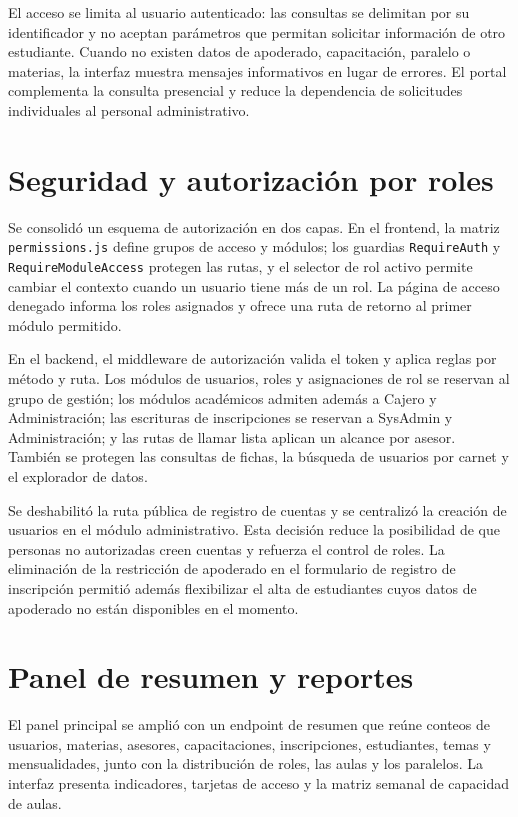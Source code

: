 \documentclass[12pt,a4paper,oneside]{report}
\begin{document}
El acceso se limita al usuario autenticado: las consultas se delimitan por su identificador y no aceptan parámetros que permitan solicitar información de otro estudiante. Cuando no existen datos de apoderado, capacitación, paralelo o materias, la interfaz muestra mensajes informativos en lugar de errores. El portal complementa la consulta presencial y reduce la dependencia de solicitudes individuales al personal administrativo.

\section{Seguridad y autorización por roles}

Se consolidó un esquema de autorización en dos capas. En el frontend, la matriz \texttt{permissions.js} define grupos de acceso y módulos; los guardias \texttt{RequireAuth} y \texttt{RequireModuleAccess} protegen las rutas, y el selector de rol activo permite cambiar el contexto cuando un usuario tiene más de un rol. La página de acceso denegado informa los roles asignados y ofrece una ruta de retorno al primer módulo permitido.

En el backend, el middleware de autorización valida el token y aplica reglas por método y ruta. Los módulos de usuarios, roles y asignaciones de rol se reservan al grupo de gestión; los módulos académicos admiten además a Cajero y Administración; las escrituras de inscripciones se reservan a SysAdmin y Administración; y las rutas de llamar lista aplican un alcance por asesor. También se protegen las consultas de fichas, la búsqueda de usuarios por carnet y el explorador de datos.

Se deshabilitó la ruta pública de registro de cuentas y se centralizó la creación de usuarios en el módulo administrativo. Esta decisión reduce la posibilidad de que personas no autorizadas creen cuentas y refuerza el control de roles. La eliminación de la restricción de apoderado en el formulario de registro de inscripción permitió además flexibilizar el alta de estudiantes cuyos datos de apoderado no están disponibles en el momento.

\section{Panel de resumen y reportes}

El panel principal se amplió con un endpoint de resumen que reúne conteos de usuarios, materias, asesores, capacitaciones, inscripciones, estudiantes, temas y mensualidades, junto con la distribución de roles, las aulas y los paralelos. La interfaz presenta indicadores, tarjetas de acceso y la matriz semanal de capacidad de aulas.
\end{document}
